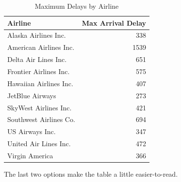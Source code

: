 \documentclass[12pt,twoside]{deuthesis}
\begin{document}
\begin{longtable}[t]{lr}
\caption[Max Delays by Airline]{\label{tab:maxdelays}Maximum Delays by Airline}\\
\toprule
Airline & Max Arrival Delay\\
\midrule
Alaska Airlines Inc. & 338\\
American Airlines Inc. & 1539\\
Delta Air Lines Inc. & 651\\
Frontier Airlines Inc. & 575\\
Hawaiian Airlines Inc. & 407\\
\addlinespace
JetBlue Airways & 273\\
SkyWest Airlines Inc. & 421\\
Southwest Airlines Co. & 694\\
US Airways Inc. & 347\\
United Air Lines Inc. & 472\\
\addlinespace
Virgin America & 366\\
\bottomrule
\end{longtable}
The last two options make the table a little easier-to-read.
\end{document}
